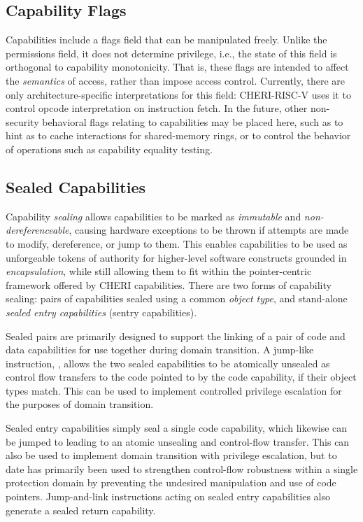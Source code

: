 \subsection{Capability Flags}
\label{sec:model-flags}
Capabilities include a flags field that can be manipulated freely.
Unlike the permissions field, it does not determine privilege, i.e., the state
of this field is orthogonal to capability monotonicity.
%
That is, these flags are intended to affect the \emph{semantics} of access,
rather than impose access control.
%
Currently, there are only architecture-specific interpretations for this
field: CHERI-RISC-V uses it to control opcode interpretation on instruction
fetch.
In the future, other non-security behavioral flags relating to capabilities may
be placed here, such
as to hint as to cache interactions for shared-memory rings, or to control
the behavior of operations such as capability equality testing.

\subsection{Sealed Capabilities}
\label{sec:model-sealedcapabilities}

Capability \textit{sealing} allows capabilities to be marked as
\textit{immutable} and \textit{non-deref\-erenceable}, causing hardware
exceptions to be thrown if attempts are made to modify, dereference, or jump
to them.
This enables capabilities to be used as unforgeable tokens of authority for
higher-level software constructs grounded in \textit{encapsulation}, while
still allowing them to fit within the pointer-centric framework offered by CHERI
capabilities.
There are two forms of capability sealing: pairs of capabilities sealed
using a common \textit{object type}, and stand-alone \textit{sealed entry
capabilities} (sentry capabilities).

Sealed pairs are primarily designed to support the linking of a pair of code
and data capabilities for use together during domain transition.
A jump-like instruction, , allows the two sealed
capabilities to be atomically unsealed as control flow transfers to the code
pointed to by the code capability, if their object types match.
This can be used to implement controlled privilege escalation for the purposes
of domain transition.

Sealed entry capabilities simply seal a single code capability, which likewise
can be jumped to leading to an atomic unsealing and control-flow transfer.
This can also be used to implement domain transition with privilege
escalation, but to date has primarily been used to strengthen control-flow
robustness within a single protection domain by preventing the undesired
manipulation and use of code pointers.
Jump-and-link instructions acting on sealed entry capabilities also generate
a sealed return capability.

